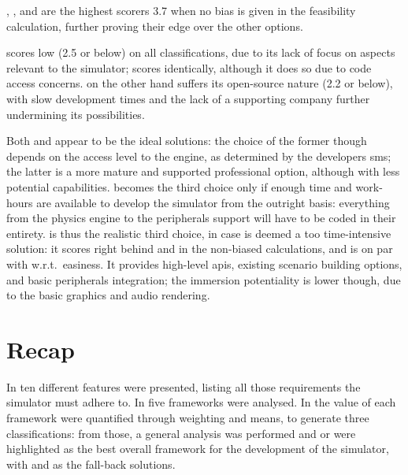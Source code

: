 , , and  are the highest scorers \num{3,7} when no bias is given in the \gls{feasibility} calculation, further proving their edge over the other options.

 scores low (\num{2,5} or below) on all classifications, due to its lack of focus on aspects relevant to the simulator;  scores identically, although it does so due to code access concerns.  on the other hand suffers its open-source nature (\num{2,2} or below), with slow development times and the lack of a supporting company further undermining its possibilities.

Both  and  appear to be the ideal solutions: the choice of the former though depends on the access level to the engine, as determined by the developers \gls{sms}; the latter is a more mature and supported professional option, although with less potential capabilities.  becomes the third choice only if enough time and work-hours are available to develop the simulator from the outright basis: everything from the physics engine to the peripherals support will have to be coded in their entirety.  is thus the realistic third choice, in case  is deemed a too time-intensive solution: it scores right behind  and  in the non-biased calculations, and is on par with  w.r.t.\ \gls{easiness}. It provides high-level \glspl{api}, existing scenario building options, and basic peripherals integration; the immersion potentiality is lower though, due to the basic graphics and audio rendering.

\section{Recap}\label{sc:stateoftheart:recap}

In  ten different \glspl{feature} were presented, listing all those requirements the simulator must adhere to. In  five \glspl{framework} were analysed. In  the value of each \gls{framework} were quantified through weighting and means, to generate three classifications: from those, a general analysis was performed and  or  were highlighted as the best overall \gls{framework} for the development of the simulator, with  and  as the fall-back solutions.
